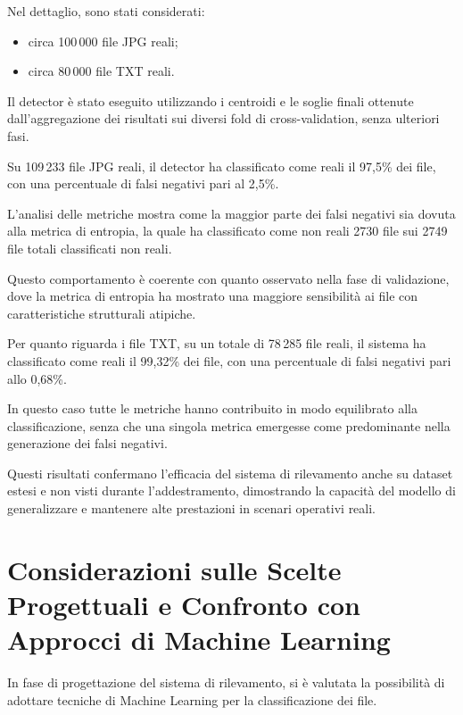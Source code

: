 \documentclass{report}
\begin{document}
\bigskip

Nel dettaglio, sono stati considerati:
\begin{itemize}
    \item circa 100\,000 file JPG reali;
    \item circa 80\,000 file TXT reali.
\end{itemize}

\bigskip

Il detector è stato eseguito utilizzando i centroidi e le soglie finali ottenute
dall’aggregazione dei risultati sui diversi fold di cross-validation, senza
ulteriori fasi.

\bigskip

Su 109\,233 file JPG reali, il detector ha classificato come reali il 97,5\% dei file,
con una percentuale di falsi negativi pari al 2,5\%.

L'analisi delle metriche mostra come la maggior parte dei falsi negativi sia dovuta alla metrica di entropia,
la quale ha classificato come non reali 2730 file sui 2749 file totali classificati non reali.

Questo comportamento è coerente con quanto osservato nella fase di validazione, dove la metrica di entropia ha mostrato una maggiore sensibilità
ai file con caratteristiche strutturali atipiche.

\bigskip

Per quanto riguarda i file TXT, su un totale di 78\,285 file reali, il sistema ha classificato come reali il 99,32\% dei file,
con una percentuale di falsi negativi pari allo 0,68\%.

In questo caso tutte le metriche hanno contribuito in modo equilibrato alla classificazione,
senza che una singola metrica emergesse come predominante nella generazione dei falsi negativi.

\bigskip

Questi risultati confermano l'efficacia del sistema di rilevamento anche su dataset estesi e non visti durante l'addestramento,
dimostrando la capacità del modello di generalizzare e mantenere alte prestazioni in scenari operativi reali.




\section{Considerazioni sulle Scelte Progettuali e Confronto con Approcci di Machine Learning}

In fase di progettazione del sistema di rilevamento, si è valutata la possibilità
di adottare tecniche di Machine Learning per la classificazione dei file.
\end{document}
